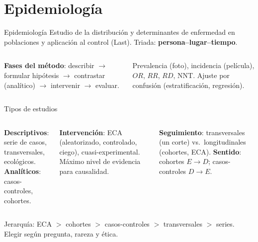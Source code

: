 \documentclass[aspectratio=169,8pt]{beamer}
\begin{document}
\section{Epidemiolog\'ia}

\begin{frame}{Epidemiolog\'ia}
  \small Estudio de la distribuci\'on y determinantes de enfermedad en poblaciones y aplicaci\'on al control (Last). Triada: \textbf{persona--lugar--tiempo}.
  \vspace{0.3em}
  \begin{columns}[T,onlytextwidth]
      \textbf{Fases del m\'etodo}: describir $\to$ formular hip\'otesis $\to$ contrastar (anal\'itico) $\to$ intervenir $\to$ evaluar.
      \begin{tcolorbox}[formulabox,title=Medidas b\'asicas]
        \scriptsize
        Prevalencia (foto), incidencia (pel\'icula), $OR$, $RR$, $RD$, NNT. Ajuste por confusi\'on (estratificaci\'on, regresi\'on).
      \end{tcolorbox}
    \end{columns}
\end{frame}

\begin{frame}{Tipos de estudios}
  \small
  \begin{columns}[T,onlytextwidth]
      \begin{tcolorbox}[formulabox,title=Observacionales]
        \footnotesize
        \textbf{Descriptivos}: serie de casos, transversales, ecol\'ogicos.\\
        \textbf{Anal\'iticos}: casos-controles, cohortes.
      \end{tcolorbox}
      \begin{tcolorbox}[tealbox]
        \footnotesize\textbf{Intervenci\'on}: ECA (aleatorizado, controlado, ciego), cuasi-experimental. M\'aximo nivel de evidencia para causalidad.
      \end{tcolorbox}
      \begin{tcolorbox}[amberbox]
        \footnotesize\textbf{Seguimiento}: transversales (un corte) vs.\ longitudinales (cohortes, ECA). \textbf{Sentido}: cohortes $E\to D$; casos-controles $D\to E$.
      \end{tcolorbox}
    \end{columns}
    \vspace{0.4em}
    {\scriptsize\color{neutral}Jerarqu\'ia: ECA $>$ cohortes $>$ casos-controles $>$ transversales $>$ series. Elegir seg\'un pregunta, rareza y \'etica.}
\end{frame}
\end{document}
